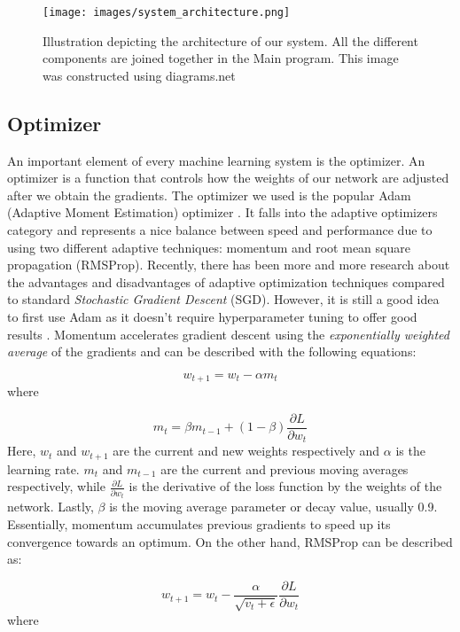 \documentclass[times, utf8, diplomski, english]{fer_eng}
\begin{document}
\begin{figure}[h]
	\centering
	\texttt{[image: images/system\_architecture.png]}
	\caption[Architecture]{Illustration depicting the architecture of our system. All the different components are joined together in the Main program. This image was constructed using diagrams.net\footnotemark{}}
	\label{fig:architecture}
\end{figure}

\subsection{Optimizer}
\label{subsec:optimizer}

An important element of every machine learning system is the optimizer. An optimizer is a function that controls how the weights of our network are adjusted after we obtain the gradients. The optimizer we used is the popular Adam (Adaptive Moment Estimation) optimizer \cite{adam}. It falls into the adaptive optimizers category and represents a nice balance between speed and performance due to using two different adaptive techniques: momentum and root mean square propagation (RMSProp). Recently, there has been more and more research about the advantages and disadvantages of adaptive optimization techniques compared to standard \textit{Stochastic Gradient Descent} (SGD). However, it is still a good idea to first use Adam as it doesn't require hyperparameter tuning to offer good results \cite{optimizers}. Momentum accelerates gradient descent using the \textit{exponentially weighted average} of the gradients and can be described with the following equations:

\[ w_{t+1} = w_t - \alpha m_t \]
where

\[ m_t = \beta m_{t-1} + (1 - \beta)  \frac{\partial L}{\partial w_t} \]
Here, $w_t$ and $w_{t+1}$ are the current and new weights respectively and $\alpha$ is the learning rate. $m_t$ and $m_{t-1}$ are the current and previous moving averages respectively, while $\frac{\partial L}{\partial w_t}$ is the derivative of the loss function by the weights of the network. Lastly, $\beta$ is the moving average parameter or decay value, usually 0.9. Essentially, momentum accumulates previous gradients to speed up its convergence towards an optimum. On the other hand, RMSProp can be described as:

\[ w_{t+1} = w_t - \frac{\alpha}{\sqrt{v_t + \epsilon}} \frac{\partial L}{\partial w_t} \]
where
\end{document}
